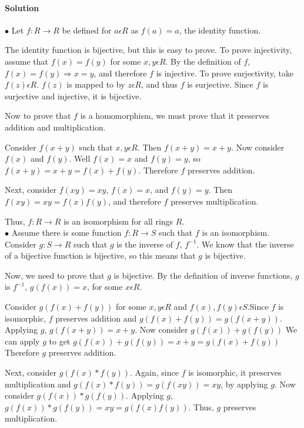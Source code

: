 \documentclass[a4paper,11pt]{article}
\begin{document}
\paragraph{Solution\\}  
$\bullet$ Let $f: R \rightarrow R$ be defined for $a \epsilon R$ as  $f(a) = a$, the identity function. 

The identity function is bijective, but this is easy to prove. To prove injectivity, assume that $f(x) = f(y)$ for some $x,y \epsilon R$. By the definition of $f$, $f(x) = f(y) \Rightarrow x = y$, and therefore $f$ is injective. To prove surjectivity, take $f(z) \epsilon R$. $f(z)$ is mapped to by $z \epsilon R$, and thus $f$ is surjective. Since $f$ is surjective and injective, it is bijective.

Now to prove that $f$ is a homomorphism, we must prove that it preserves addition and multiplication. 

Consider $f(x + y)$ such that $x,y \epsilon R$. Then $f(x+y) = x + y$. Now consider $f(x)$ and $f(y)$. Well $f(x) = x$ and $f(y) = y$, so $f(x+y) = x + y = f(x) + f(y)$. Therefore $f$ preserves addition.

Next, consider $f(xy) = xy$, $f(x) = x$, and $f(y) = y$. Then $f(xy) = xy = f(x)f(y)$, and therefore $f$ preserves multiplication.

Thus, $f: R \rightarrow R$ is an isomorphism for all rings $R$.\\

$\bullet$ Assume there is some function $f: R \rightarrow S$ such that $f$ is an isomorphism. Consider $g: S \rightarrow R$ such that $g$ is the inverse of $f$, $f^{-1}$. We know that the inverse of a bijective function is bijective, so this means that $g$ is bijective. 

Now, we need to prove that $g$ is bijective. By the definition of inverse functions, $g$ is $f^{-1}$, $g(f(x)) = x$, for some $x \epsilon R$.

Consider $g(f(x) + f(y))$ for some $x,y \epsilon R$ and $f(x), f(y) \epsilon S$.Since $f$ is isomorphic, $f$ preserves addition and $g(f(x) + f(y)) = g(f(x+y))$. Applying $g$, $g(f(x+y)) = x + y$. Now consider $g(f(x)) + g(f(y))$ We can apply $g$ to get $g(f(x)) + g(f(y)) = x + y = g(f(x) + f(y))$ Therefore $g$ preserves addition.

Next, consider $g(f(x)*f(y))$. Again, since $f$ is isomorphic, it preserves multiplication and $g(f(x)*f(y)) = g(f(xy)) = xy$, by applying $g$. Now consider $g(f(x))*g(f(y))$. Applying $g$, $g(f(x))*g(f(y)) = xy = g(f(x)f(y))$. Thus, $g$ preserves multiplication. 
\end{document}
